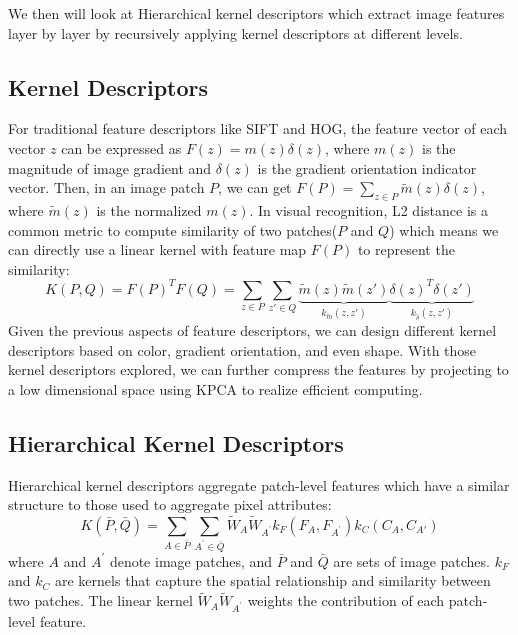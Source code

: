 \documentclass[10pt,twocolumn,letterpaper]{article}
\begin{document}
We then will look at Hierarchical kernel descriptors \cite{bo_cvpr11} which extract image features layer by layer by recursively applying kernel descriptors at different levels. 

\subsection{Kernel Descriptors}
For traditional feature descriptors like SIFT and HOG, the feature vector of each vector $z$ can be expressed as $F(z)=m(z)\delta(z)$, where $m(z)$ is the magnitude of image gradient and $\delta(z)$ is the gradient orientation indicator vector. Then, in an image patch $P$, we can get $F(P) = \sum_{z\in P}\tilde{m}(z)\delta(z)$, where $\tilde{m}(z)$ is the normalized $m(z)$. In visual recognition, L2 distance is a common metric to compute similarity of two patches($P$ and $Q$) which means we can directly use a linear kernel with feature map $F(P)$ to represent the similarity:
$$K(P,Q) = F(P)^TF(Q) = \sum_{z\in P}\sum_{z'\in Q}\underbrace{\tilde{m}(z)\tilde{m}(z')}_{k_{\tilde{m}}(z,z')}\underbrace{\delta(z)^T\delta(z')}_{k_{\tilde{\delta}}(z,z')}$$
Given the previous aspects of feature descriptors, we can design different kernel descriptors based on color, gradient orientation, and even shape. With those kernel descriptors explored, we can further compress the features by projecting to a low dimensional space using KPCA to realize efficient computing. 

\subsection{Hierarchical Kernel Descriptors} 
Hierarchical kernel descriptors aggregate patch-level features which have a similar structure to those used to aggregate pixel attributes:
$$
K(\bar{P}, \bar{Q}) = \sum_{A \in \bar{P}} \sum_{A^{\prime} \in \bar{Q}} \tilde{W}_A \tilde{W}_{A^{\prime}} k_F (F_A, F_{A^{\prime}}) k_C (C_A, C_{A\prime})
$$
where $A$ and $A^{\prime}$ denote image patches, and $\bar{P}$ and $\bar{Q}$ are sets of image patches. $k_F$ and $k_C$ are kernels that capture the spatial relationship and similarity between two patches. The linear kernel $\tilde{W}_A\tilde{W}_{A^{\prime}}$ weights the contribution of each patch-level feature. 
\end{document}
